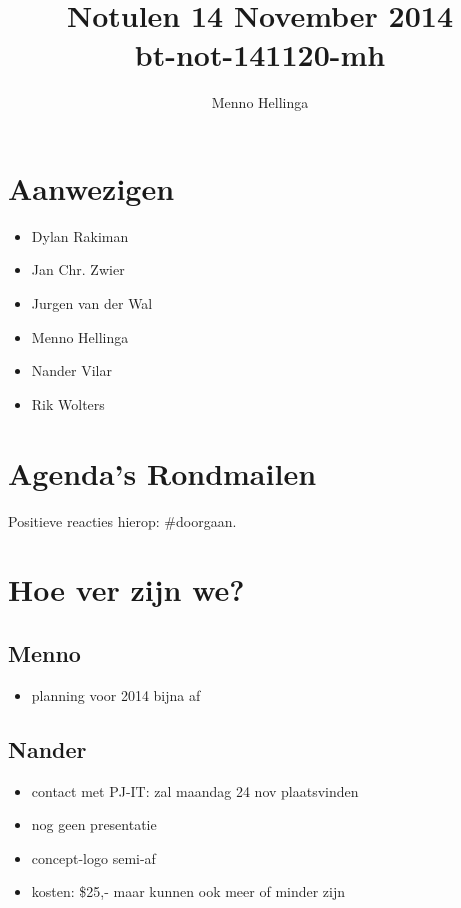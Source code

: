 \documentclass[a4paper, 10pt]{article}
\begin{document}
\frenchspacing

\title{Notulen 14 November 2014\\bt-not-141120-mh}
\author{Menno Hellinga}
\date{\empty}

\maketitle
\tableofcontents
\newpage

\section{Aanwezigen}
\begin{itemize}
	\item Dylan Rakiman
	\item Jan Chr. Zwier
	\item Jurgen van der Wal
	\item Menno Hellinga
	\item Nander Vilar
	\item Rik Wolters
\end{itemize}

\section{Agenda's Rondmailen}

Positieve reacties hierop: \#doorgaan.

\section{Hoe ver zijn we?}

\subsection{Menno}
\begin{itemize}
	\item planning voor 2014 bijna af
\end{itemize}

\subsection{Nander}
\begin{itemize}
	\item contact met PJ-IT: zal maandag 24 nov plaatsvinden
	\item nog geen presentatie
	\item concept-logo semi-af
	\item kosten: \$25,- maar kunnen ook meer of minder zijn
\end{itemize}
\end{document}
